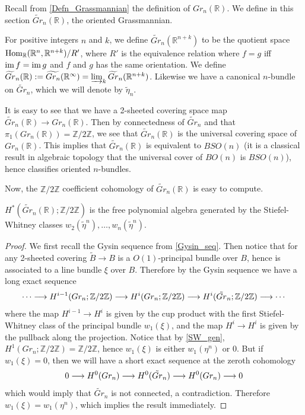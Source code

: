 	Recall from \cref{Defn_Grassmannian} the definition of $Gr_n(\mathbb{R})$. We define in this section $\widetilde{Gr}_n(\mathbb{R})$, the oriented Grassmannian. 
	\begin{defn}
		For positive integers $n$ and $k$, we define $\widetilde{Gr}_n(\mathbb{R}^{n+k})$ to be the quotient space $\operatorname{\mathrm{Hom}}_\mathbb{R}(\mathbb{R}^n,\mathbb{R}^{n+k})/R'$, where $R'$ is the equivalence relation where $f=g$ iff $\operatorname{\mathrm{im}} f=\operatorname{\mathrm{im}} g$ and $f$ and $g$ has the same orientation. We define $\widetilde{Gr}_n(\mathbb{R}):=\widetilde{Gr_n}(\mathbb{R}^\infty)=\varinjlim_k\widetilde{Gr}_n(\mathbb{R}^{n+k})$. Likewise we have a canonical $n$-bundle on $\widetilde{Gr}_n$, which we will denote by $\tilde{\eta}_n$. 
	\end{defn}
	\begin{remark}
		It is easy to see that we have a 2-sheeted covering space map $\widetilde{Gr}_n(\mathbb{R})\to Gr_n(\mathbb{R})$. Then by connectedness of $\widetilde{Gr}_n$ and that $\pi_1(Gr_n(\mathbb{R}))=\mathbb{Z}/2\mathbb{Z}$, we see that $\widetilde{Gr}_n(\mathbb{R})$ is the universal covering space of $Gr_n(\mathbb{R})$. This implies that $\widetilde{Gr}_n(\mathbb{R})$ is equivalent to $BSO(n)$ (it is a classical result in algebraic topology that the universal cover of $BO(n)$ is $BSO(n)$), hence classifies oriented $n$-bundles. 
	\end{remark}

	Now, the $\mathbb{Z}/2\mathbb{Z}$ coefficient cohomology of $\widetilde{Gr}_n(\mathbb{R})$ is easy to compute. 
	\begin{thm}\label{SW_gen_ori}
		$H^*(\widetilde{Gr}_n(\mathbb{R});\mathbb{Z}/2\mathbb{Z})$ is the free polynomial algebra generated by the Stiefel-Whitney classes $w_2(\tilde{\eta}^n),\dots,w_n(\tilde{\eta}^n)$. 
	\end{thm}
	\begin{proof}
		We first recall the Gysin sequence from \cref{Gysin_seq}. Then notice that for any 2-sheeted covering $\tilde{B}\to B$ is a $O(1)$-principal bundle over $B$, hence is associated to a line bundle $\xi$ over $B$. Therefore by the Gysin sequence we have a long exact sequence
		\[ \cdots\longrightarrow H^{i-1}(Gr_n;\mathbb{Z}/2\mathbb{Z})\longrightarrow H^i(Gr_n;\mathbb{Z}/2\mathbb{Z})\longrightarrow H^i(\tilde{Gr}_n;\mathbb{Z}/2\mathbb{Z})\longrightarrow\cdots \]
		where the map $H^{i-1}\to H^i$ is given by the cup product with the first Stiefel-Whitney class of the principal bundle $w_1(\xi)$, and the map $H^i\to H^i$ is given by the pullback along the projection. Notice that by \cref{SW_gen}, $H^1(Gr_n;\mathbb{Z}/2\mathbb{Z})=\mathbb{Z}/2\mathbb{Z}$, hence $w_1(\xi)$ is either $w_1(\eta^n)$ or $0$. But if $w_1(\xi)=0$, then we will have a short exact sequence at the zeroth cohomology
		\[ 0\longrightarrow H^0(Gr_n)\longrightarrow H^0(\tilde{Gr}_n)\longrightarrow H^0(Gr_n)\longrightarrow 0 \]
		which would imply that $\tilde{Gr}_n$ is not connected, a contradiction. 
		Therefore $w_1(\xi)=w_1(\eta^n)$, which implies the result immediately. 
	\end{proof}

